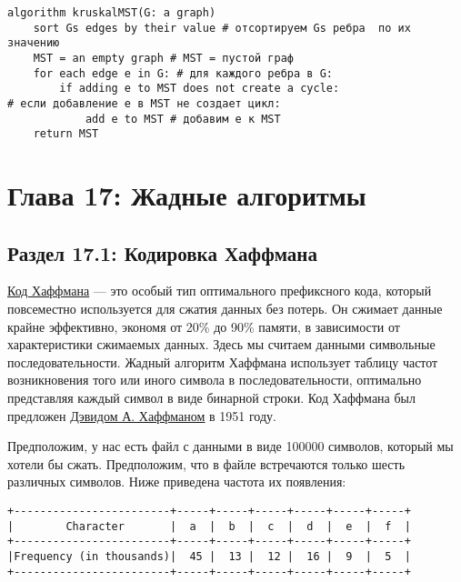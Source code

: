 \vspace{\baselineskip}
\begin{tcolorbox}
\begin{verbatim}
algorithm kruskalMST(G: a graph)
    sort Gs edges by their value # отсортируем Gs ребра  по их значению
    MST = an empty graph # MST = пустой граф
    for each edge e in G: # для каждого ребра в G:
        if adding e to MST does not create a cycle:
# если добавление e в MST не создает цикл:
            add e to MST # добавим е к MST
    return MST
\end{verbatim}
\end{tcolorbox}

\chapter*{Глава 17: Жадные алгоритмы}

\vspace{\baselineskip}
\section*{Раздел 17.1: Кодировка Хаффмана}

\vspace{\baselineskip}
\href{https://vk.cc/atQr71}{\underline{Код Хаффмана}} --- это особый тип оптимального префиксного кода, который повсеместно используется для сжатия данных без потерь. Он сжимает данные крайне эффективно, экономя от 20\% до 90\% памяти, в зависимости от характеристики сжимаемых данных. Здесь мы считаем данными символьные последовательности. Жадный алгоритм Хаффмана использует таблицу частот возникновения того или иного символа в последовательности, оптимально представляя каждый символ в виде бинарной строки. Код Хаффмана был предложен \href{https://vk.cc/atQreq}{\underline{Дэвидом А. Хаффманом}} в 1951 году.  

\vspace{\baselineskip}
Предположим, у нас есть файл с данными в виде 100000 символов, который мы хотели бы сжать. Предположим, что в файле встречаются только шесть различных символов. Ниже приведена частота их появления: 

\vspace{\baselineskip}
\begin{tcolorbox}
\begin{verbatim}
+------------------------+-----+-----+-----+-----+-----+-----+
|        Character       |  a  |  b  |  c  |  d  |  e  |  f  |
+------------------------+-----+-----+-----+-----+-----+-----+
|Frequency (in thousands)|  45 |  13 |  12 |  16 |  9  |  5  |
+------------------------+-----+-----+-----+-----+-----+-----+
\end{verbatim}
\end{tcolorbox}


